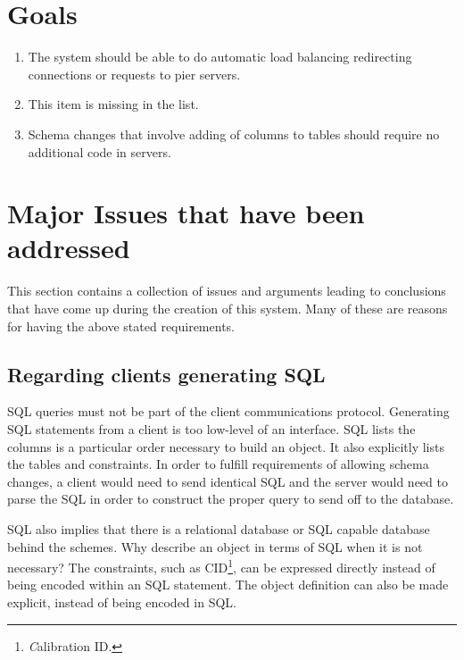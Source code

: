 \section{Goals}

\begin{enumerate}

\item

The system should be able to do automatic load balancing
\ie redirecting connections or requests to pier servers.

\item

\begin{fixme}
This item is missing in the list.
\end{fixme}

\item

Schema changes that involve adding of columns to tables should require
no additional code in servers.

\end{enumerate}

\section{Major Issues that have been addressed}

This section contains a collection of issues and arguments leading to
conclusions that have come up during the creation of this system.
Many of these are reasons for having the above stated requirements.

\subsection{Regarding clients generating SQL}

SQL queries must not be part of the client communications
protocol. Generating SQL statements from a client is too low-level of
an interface. SQL lists the columns is a particular order necessary to
build an object. It also explicitly lists the tables and
constraints. In order to fulfill requirements of allowing schema
changes, a client would need to send identical SQL and the server
would need to parse the SQL in order to construct the proper query to
send off to the database.

SQL also implies that there is a relational database or SQL capable
database behind the schemes. Why describe an object in terms of SQL
when it is not necessary? The constraints, such as
CID\footnote{\textit{C}alibration ID.}, can be expressed directly
instead of being encoded within an SQL statement. The object
definition can also be made explicit, instead of being encoded in SQL.


